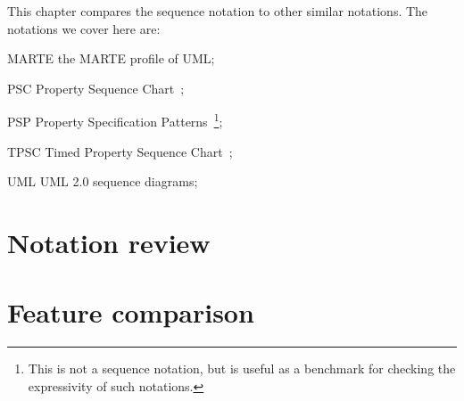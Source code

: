 
This chapter compares the \langname{} sequence notation to other similar
notations.  The notations we cover here are:


\begin{featset}
\item[MARTE] the MARTE profile of UML;
\item[PSC] Property Sequence Chart~\cite{psc};
\item[PSP] Property Specification Patterns~\cite{psp,pspsite}\footnote{This is
not a sequence notation, but is useful as a benchmark for checking the
expressivity of such notations.};
\item[TPSC] Timed Property Sequence Chart~\cite{tpsc};
\item[UML] UML 2.0 sequence diagrams;
\item {}
\end{featset}

\section{Notation review}\label{sec:seq-comparison-review}


\section{Feature comparison}\label{sec:seq-comparison-features}


